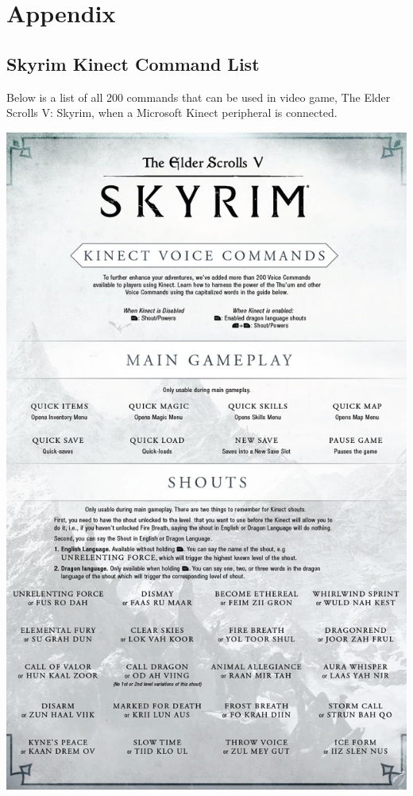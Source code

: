 \documentclass[12pt]{article}
\begin{document}
\newpage
\section{Appendix}
\subsection{Skyrim Kinect Command List}
Below is a list of all 200 commands that can be used in video game, The Elder Scrolls V: Skyrim, when a Microsoft Kinect peripheral is connected.

\includegraphics[scale=0.235]{skyrim-1.jpg}
\end{document}
